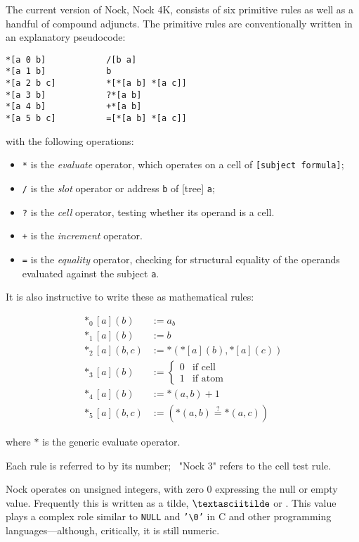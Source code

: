 The current version of Nock, Nock 4K, consists of six primitive rules as well as a handful of compound adjuncts.  The primitive rules are conventionally written in an explanatory pseudocode:

\begin{lstlisting}[style=nonumbers]
*[a 0 b]            /[b a]
*[a 1 b]            b
*[a 2 b c]          *[*[a b] *[a c]]
*[a 3 b]            ?*[a b]
*[a 4 b]            +*[a b]
*[a 5 b c]          =[*[a b] *[a c]]
\end{lstlisting}

with the following operations:

\begin{itemize}
  \item  \texttt{*} is the \emph{evaluate} operator, which operates on a cell of \texttt{[subject formula]};
  \item  \texttt{/} is the \emph{slot} operator or address \texttt{b} of [tree] \texttt{a};
  \item  \texttt{?} is the \emph{cell} operator, testing whether its operand is a cell.
  \item  \texttt{+} is the \emph{increment} operator.
  \item  \texttt{=} is the \emph{equality} operator, checking for structural equality of the operands evaluated against the subject \texttt{a}.
\end{itemize}

It is also instructive to write these as mathematical rules:

\begin{align}
*_{0}[a](b) &:= a_{b} \\
*_{1}[a](b) &:= b \\
*_{2}[a](b,c) &:= *({*[a](b)}, {*[a](c)}) \\
*_{3}[a](b) &:= \left\{\begin{matrix} 0 & \text{if cell} \\ 1 & \text{if atom} \end{matrix} \right. \\
*_{4}[a](b) &:= {*(a,b) + 1} \\
*_{5}[a](b,c) &:= ({*(a,b)} \stackrel{?}{=} {*(a,c)})
\end{align}

where $*$ is the generic evaluate operator.

Each rule is referred to by its number; \eg~"Nock 3" refers to the cell test rule.

Nock operates on unsigned integers, with zero $0$ expressing the null or empty value.  Frequently this is written as a tilde, $\textasciitilde$ or \nullchr.  This value plays a complex role similar to \texttt{NULL} and \texttt{'\textbackslash 0'} in C and other programming languages—although, critically, it is still numeric.

